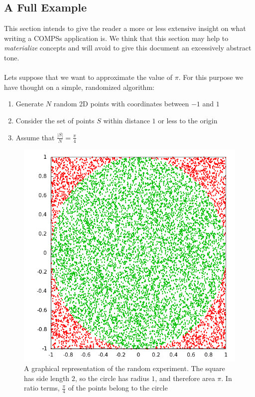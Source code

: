 \newpage
\subsection{A Full Example}
\label{subsec:compss_example}
This section intends to give the reader a more or less extensive insight on what writing a COMPSs application is. We think that this section may help to \textit{materialize} concepts and will avoid to give this document an excessively abstract tone.\\
\\
Lets suppose that we want to approximate the value of $\pi$. For this purpose we have thought on a simple, randomized algorithm:
\begin{enumerate}
\item Generate $N$ random 2D points with coordinates between $-1$ and $1$
\item Consider the set of points $S$ within distance $1$ or less to the origin
\item Assume that $\frac{|S|}{N} = \frac{\pi}{4}$
\end{enumerate}

\begin{figure}[ht!]
\centering
\includegraphics[scale=0.5]{figures/circle_square.png}
\caption{A graphical representation of the random experiment. The square has side length $2$, so the circle has radius $1$, and therefore area $\pi$. In ratio terms, $\frac{\pi}{4}$ of the points belong to the circle}
\label{fig:circle_square}
\end{figure}

